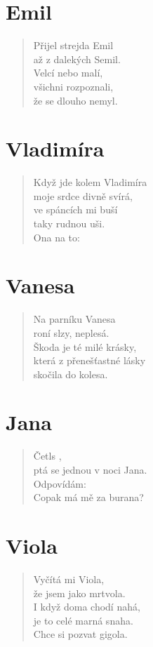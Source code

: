 \section*{Emil}
\begin{verse}
Přijel strejda Emil\\
až z dalekých Semil.\\
Velcí nebo malí,\\
všichni rozpoznali,\\
že se dlouho nemyl.	
\end{verse}

\section*{Vladimíra}
\begin{verse}
Když jde kolem Vladimíra\\
moje srdce divně svírá,\\
ve spáncích mi buší\\
taky rudnou uši.\\
Ona na to: 
\end{verse}

\section*{Vanesa}
\begin{verse}
Na parníku Vanesa\\
roní slzy, neplesá.\\
Škoda je té milé krásky,\\
která z přenešťastné lásky\\
skočila do kolesa.	
\end{verse}

\section*{Jana}
\begin{verse}
Četls ,\\
ptá se jednou v noci Jana.\\
Odpovídám: \\
Copak má mě za burana?
\end{verse}

\section*{Viola}
\begin{verse}
Vyčítá mi Viola, \\
že jsem jako mrtvola.\\
I když doma chodí nahá,\\
je to celé marná snaha.\\
Chce si pozvat gigola.	
\end{verse}

